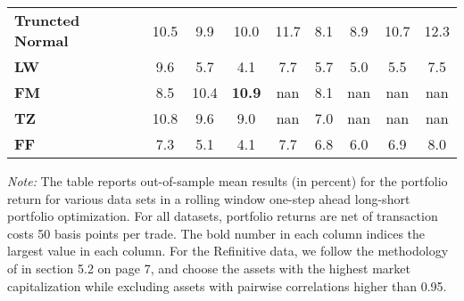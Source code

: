 \begin{table}[p]
{\begin{tabularx}{\textwidth}{Xcccccccc}
\textbf{Truncted Normal} & \cellcolor{gray!27}10.5 & \cellcolor{gray!31}9.9 & \cellcolor{gray!31}10.0 & \cellcolor{gray!40}11.7 & \cellcolor{gray!31}8.1 & \cellcolor{gray!40}8.9 & \cellcolor{gray!40}10.7 & \cellcolor{gray!40}12.3 \\
\textbf{LW} & \cellcolor{gray!22}9.6 & \cellcolor{gray!18}5.7 & \cellcolor{gray!9}4.1 & \cellcolor{gray!27}7.7 & \cellcolor{gray!4}5.7 & \cellcolor{gray!27}5.0 & \cellcolor{gray!27}5.5 & \cellcolor{gray!27}7.5 \\
\textbf{FM} & \cellcolor{gray!18}8.5 & \cellcolor{gray!36}10.4 & \cellcolor{gray!43}\textbf{10.9} & \cellcolor{gray!0}nan & \cellcolor{gray!36}8.1 & \cellcolor{gray!0}nan & \cellcolor{gray!0}nan & \cellcolor{gray!0}nan \\
\textbf{TZ} & \cellcolor{gray!36}10.8 & \cellcolor{gray!27}9.6 & \cellcolor{gray!27}9.0 & \cellcolor{gray!0}nan & \cellcolor{gray!22}7.0 & \cellcolor{gray!0}nan & \cellcolor{gray!0}nan & \cellcolor{gray!0}nan \\
\textbf{FF} & \cellcolor{gray!0}7.3 & \cellcolor{gray!4}5.1 & \cellcolor{gray!4}4.1 & \cellcolor{gray!31}7.7 & \cellcolor{gray!18}6.8 & \cellcolor{gray!31}6.0 & \cellcolor{gray!31}6.9 & \cellcolor{gray!31}8.0 \\
\bottomrule
\end{tabularx}
\vspace{0.3em}
{\footnotesize \textit{Note:} The table reports out-of-sample mean results (in percent) for the portfolio return for various data sets in a rolling window one-step ahead long-short portfolio optimization. For all datasets, portfolio returns are net of transaction costs 50 basis points per trade. The bold number in each column indices the largest value in each column. For the Refinitive data, we follow the methodology of \citet{denard2022} in section 5.2 on page 7, and choose the assets with the highest market capitalization while excluding assets with pairwise correlations higher than 0.95. }}
\end{table}
